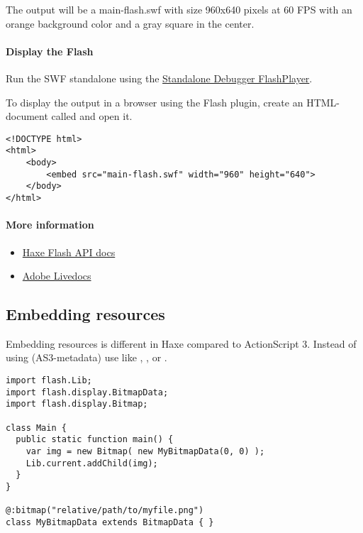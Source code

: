 The output will be a main-flash.swf with size 960x640 pixels at 60 FPS with an orange background color and a gray square in the center.

\paragraph{Display the Flash}

Run the SWF standalone using the \href{https://www.adobe.com/support/flashplayer/downloads.html}{Standalone Debugger FlashPlayer}. 

To display the output in a browser using the Flash plugin, create an HTML-document called  and open it.

\begin{lstlisting}
<!DOCTYPE html>
<html>
	<body>
		<embed src="main-flash.swf" width="960" height="640">
	</body>
</html>
\end{lstlisting}

\paragraph{More information}

\begin{itemize}
	\item \href{http://api.haxe.org/flash/}{Haxe Flash API docs}
	\item \href{http://help.adobe.com/en_US/FlashPlatform/reference/actionscript/3/}{Adobe Livedocs}
\end{itemize}

\subsection{Embedding resources}
\label{target-flash-resources}

Embedding resources is different in Haxe compared to ActionScript 3. Instead of using \ic{\[embed\]} (AS3-metadata) use  like , ,  or .

\begin{lstlisting}
import flash.Lib;
import flash.display.BitmapData;
import flash.display.Bitmap;

class Main {
  public static function main() {
    var img = new Bitmap( new MyBitmapData(0, 0) );
    Lib.current.addChild(img);
  }
}

@:bitmap("relative/path/to/myfile.png") 
class MyBitmapData extends BitmapData { }
\end{lstlisting}

